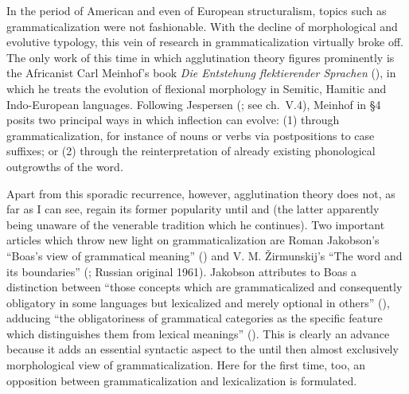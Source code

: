 In the period of American and even of European structuralism, topics such as grammaticalization were not fashionable. With the decline of morphological and evolutive typology, this vein of research in grammaticalization virtually broke off. The only work of this time in which agglutination theory figures prominently is the Africanist Carl Meinhof's book \textit{Die Entstehung flektierender Sprachen} (\citeyear{Meinhof1936}), in which he treats the evolution of flexional morphology in Semitic, Hamitic and Indo-European languages. Following Jespersen (\citeyear[375--388]{Jespersen1922}; see ch.~V.4), Meinhof in §4 posits two principal ways in which inflection can evolve: (1) through grammaticalization, for instance of nouns or verbs via postpositions to case suffixes; or (2) through the reinterpretation of already existing phonological outgrowths of the word.

Apart from this sporadic recurrence, however, agglutination theory does not, as far as I can see, regain its former popularity until \citet{Hodge1970} and \citet{Givón1971} (the latter apparently being unaware of the venerable tradition which he continues). Two important articles which throw new light on grammaticalization are Roman Jakobson's “Boas's view of grammatical meaning” (\citeyear{Jakobson1959}) and V. M. Žirmunskij's “The word and its boundaries” (\citeyear{Žirmunskij1966}; Russian original 1961). Jakobson attributes to Boas a distinction between “those concepts which are grammaticalized and consequently obligatory in some languages but lexicalized and merely optional in others” (\citeyear[492]{Jakobson1959}), adducing “the obligatoriness of grammatical categories as the specific feature which distinguishes them from lexical meanings” \label{quote:Jakobson} (\citeyear[489]{Jakobson1959}). This is clearly an advance because it adds an essential syntactic aspect to the until then almost exclusively morphological view of grammaticalization. Here for the first time, too, an opposition between grammaticalization and lexicalization is formulated.

